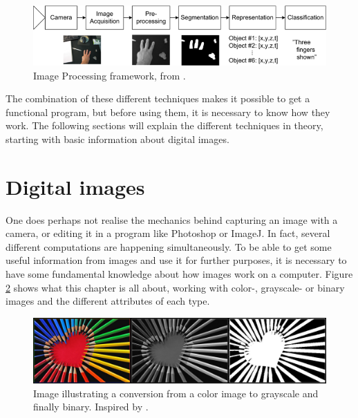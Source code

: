 \begin{figure}[htbp]
\centering
\includegraphics[width=1.00\textwidth]{Pictures/Theory/imageProcessing_steps.png}
\caption{Image Processing framework, from \citep{ip_book}.}
\label{fig:ip_framework}
\end{figure}


The combination of these different techniques makes it possible to get a functional program, but before using them, it is necessary to know how they work. The following sections will explain the different techniques in theory, starting with basic information about digital images.

\section{Digital images}
One does perhaps not realise the mechanics behind capturing an image with a camera, or editing it in a program like Photoshop or ImageJ. In fact, several different computations are happening simultaneously. To be able to get some useful information from images and use it for further purposes, it is necessary to have some fundamental knowledge about how images work on a computer. Figure \ref{fig:ip_ColoredToGrayscaleToBinary} shows what this chapter is all about, working with color-, grayscale- or binary images and the different attributes of each type.

\begin{figure}[htbp]
\centering
\includegraphics[width=1.00\textwidth]{Pictures/Theory/ColoredToGrayscaleToBinary.jpg}
\caption{Image illustrating a conversion from a color image to grayscale and finally binary. Inspired by \citep{colorPencils}.}
\label{fig:ip_ColoredToGrayscaleToBinary}
\end{figure}

